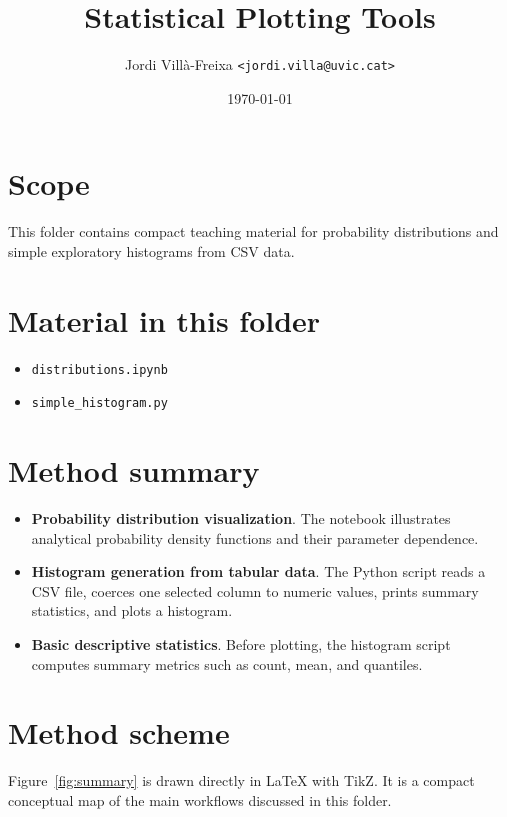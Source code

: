 \documentclass[11pt,a4paper]{article}
\title{Statistical Plotting Tools}
\author{Jordi Vill\`a-Freixa \texttt{<jordi.villa@uvic.cat>}}
\date{\today}
\begin{document}
    \maketitle

    \section*{Scope}
    This folder contains compact teaching material for probability distributions and simple exploratory histograms from CSV data.

    \section*{Material in this folder}
    \begin{itemize}[leftmargin=*]
\item \texttt{distributions.ipynb}
\item \texttt{simple\_histogram.py}
    \end{itemize}

    \section*{Method summary}
    \begin{itemize}[leftmargin=*]
\item \textbf{Probability distribution visualization}. The notebook illustrates analytical probability density functions and their parameter dependence.
\item \textbf{Histogram generation from tabular data}. The Python script reads a CSV file, coerces one selected column to numeric values, prints summary statistics, and plots a histogram.
\item \textbf{Basic descriptive statistics}. Before plotting, the histogram script computes summary metrics such as count, mean, and quantiles.
    \end{itemize}

    \section*{Method scheme}
    Figure~\ref{fig:summary} is drawn directly in LaTeX with TikZ. It is a compact conceptual map of the main workflows discussed in this folder.
\end{document}
